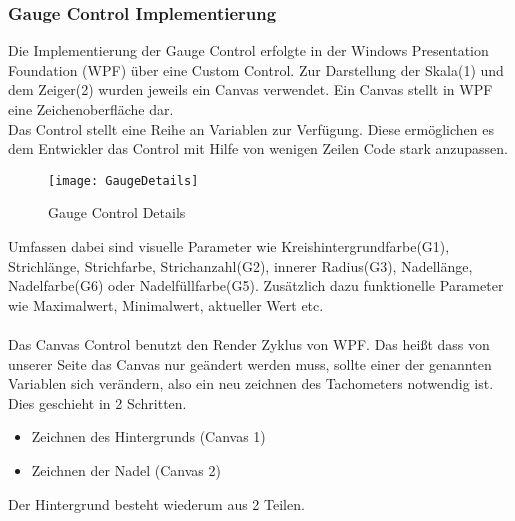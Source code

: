 \subsubsection{Gauge Control Implementierung}

Die Implementierung der Gauge Control erfolgte in der Windows Presentation Foundation (WPF) über eine Custom Control. Zur Darstellung der Skala(1) und dem Zeiger(2) wurden jeweils ein Canvas verwendet. Ein Canvas stellt in WPF eine Zeichenoberfläche dar.\\



Das Control stellt eine Reihe an Variablen zur Verfügung. Diese ermöglichen es dem Entwickler das Control mit Hilfe von wenigen Zeilen Code stark anzupassen. 
\begin{figure}[ht]
	\centering
	\texttt{[image: GaugeDetails]}
	\caption{Gauge Control Details}
	\label{fig:gauge1}
\end{figure}
Umfassen dabei sind visuelle Parameter wie Kreishintergrundfarbe(G1), Strichlänge, Strichfarbe, Strichanzahl(G2), innerer Radius(G3), Nadellänge, Nadelfarbe(G6) oder Nadelfüllfarbe(G5). Zusätzlich dazu funktionelle Parameter wie Maximalwert, Minimalwert, aktueller Wert etc.\\\\

Das Canvas Control benutzt den Render Zyklus von WPF. Das heißt dass von unserer Seite das Canvas nur geändert werden muss, sollte einer der genannten Variablen sich verändern, also ein neu zeichnen des Tachometers notwendig ist.\\
Dies geschieht in 2 Schritten. \\
\begin{itemize}
	\item Zeichnen des Hintergrunds (Canvas 1)
	\item Zeichnen der Nadel (Canvas 2)
\end{itemize}

Der Hintergrund besteht wiederum aus 2 Teilen. \\

